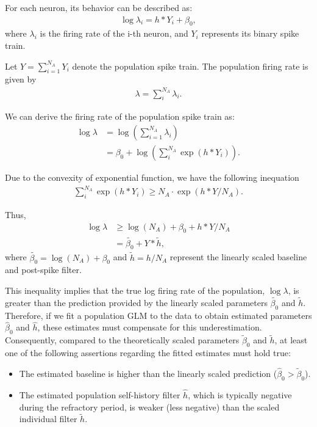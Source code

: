 \documentclass[12pt]{article}
\begin{document}
For each neuron, its behavior can be described as:
\begin{align}
\log \lambda_i = h*Y_i + \beta_0,
\end{align}
where $\lambda_i$ is the firing rate of the i-th neuron, and $Y_i$ represents its binary spike train.

Let $Y=\sum_{i=1}^{N_A} Y_i$ denote the population spike train. The population firing rate is given by 
\begin{align}
\lambda=\sum_i^{N_A} \lambda_i.
\end{align}

We can derive the firing rate of the population spike train as:
\begin{align}
\log \lambda &= \log \left ( \sum_{i=1}^{N_A} \lambda_i \right ) \\
&= \beta_0  + \log \left ( \sum_i^{N_A} \exp(h*Y_i)  \right ).
\end{align}

Due to the convexity of exponential function, we have the following inequation
\begin{align} 
\sum_i^{N_A} \exp(h*Y_i) \geq N_A \cdot \exp(h*Y/N_A).
\end{align}

Thus, 
\begin{align}
\log \lambda &\geq \log(N_A)+\beta_0 + h*Y/N_A \\
&= \tilde{\beta_0} + Y*\tilde{h},
\end{align}
where $\tilde{\beta_0}=\log(N_A)+\beta_0$ and $\tilde{h}=h/N_A$ represent the linearly scaled baseline and post-spike filter.

This inequality implies that the true log firing rate of the population, $\log \lambda$, is greater than the prediction provided by the linearly scaled parameters $\tilde{\beta_0}$ and $\tilde{h}$. Therefore, if we fit a population GLM to the data to obtain estimated parameters $\hat{\beta}_0$ and $\hat{h}$, these estimates must compensate for this underestimation. Consequently, compared to the theoretically scaled parameters $\tilde{\beta}_0$ and $\tilde{h}$, at least one of the following assertions regarding the fitted estimates must hold true:
\begin{itemize}
    \item The estimated baseline is higher than the linearly scaled prediction ($\hat{\beta}_0 > \tilde{\beta}_0$).
    \item The estimated population self-history filter $\hat{h}$, which is typically negative during the refractory period, is weaker (less negative) than the scaled individual filter $\tilde{h}$.
\end{itemize}
\end{document}
